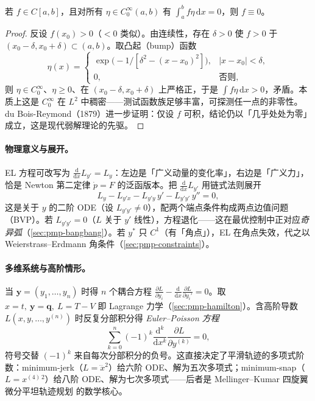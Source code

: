 \begin{lemma}\label{lem:pmp-dubois}
若 $f\in C[a,b]$，且对所有 $\eta\in C_0^\infty(a,b)$ 有 $\int_a^b f\eta\,\mathrm dx=0$，则 $f\equiv 0$。
\end{lemma}

\begin{proof}
反设 $f(x_0)>0$（$<0$ 类似）。由连续性，存在 $\delta>0$ 使 $f>0$ 于 $(x_0-\delta,x_0+\delta)\subset(a,b)$。取凸起（bump）函数
\begin{equation}
  \eta(x)=\begin{cases}\exp\!\big(-1/[\delta^2-(x-x_0)^2]\big),&|x-x_0|<\delta,\\[2pt]0,&\text{否则,}\end{cases}
  \label{eq:pmp-bump}
\end{equation}
则 $\eta\in C_0^\infty$、$\eta\ge 0$、在 $(x_0-\delta,x_0+\delta)$ 上严格正，于是 $\int f\eta\,\mathrm dx>0$，矛盾。本质上这是 $C_0^\infty$ 在 $L^2$ 中稠密——测试函数族足够丰富，可探测任一点的非零性。du Bois-Reymond（1879）进一步证明：仅设 $f$ 可积，结论仍以「几乎处处为零」成立，这是现代弱解理论的先驱。
\end{proof}

\paragraph{物理意义与展开。}
EL 方程可改写为 $\tfrac{\mathrm d}{\mathrm dx}L_{y'}=L_y$：左边是「广义动量的变化率」，右边是「广义力」，恰是 Newton 第二定律 $\dot p=F$ 的泛函版本。把 $\tfrac{\mathrm d}{\mathrm dx}L_{y'}$ 用链式法则展开
\begin{equation}
  L_y-L_{y'x}-L_{y'y}\,y'-L_{y'y'}\,y''=0,
  \label{eq:pmp-el-expanded}
\end{equation}
这是关于 $y$ 的二阶 ODE（设 $L_{y'y'}\ne 0$），配两个端点条件构成两点边值问题（BVP）。若 $L_{y'y'}=0$（$L$ 关于 $y'$ 线性），方程退化——这在最优控制中正对应\emph{奇异弧}（\cref{sec:pmp-bangbang}）。若 $y^\ast$ 只 $C^1$（有「角点」），EL 在角点失效，代之以 Weierstrass--Erdmann 角条件（\cref{sec:pmp-constraints}）。

\paragraph{多维系统与高阶情形。}
当 $\mathbf y=(y_1,\dots,y_n)$ 时得 $n$ 个耦合方程 $\tfrac{\partial L}{\partial y_i}-\tfrac{\mathrm d}{\mathrm dx}\tfrac{\partial L}{\partial y_i'}=0$。取 $x=t,\ \mathbf y=\mathbf q,\ L=T-V$ 即 Lagrange 力学（\cref{sec:pmp-hamilton}）。含高阶导数 $L(x,y,\dots,y^{(n)})$ 时反复分部积分得 \emph{Euler--Poisson 方程}
\begin{equation}
  \sum_{k=0}^{n}(-1)^k\frac{\mathrm d^k}{\mathrm dx^k}\frac{\partial L}{\partial y^{(k)}}=0,
  \label{eq:pmp-euler-poisson}
\end{equation}
符号交替 $(-1)^k$ 来自每次分部积分的负号。这直接决定了平滑轨迹的多项式阶数：minimum-jerk（$L=\dddot x^2$）给六阶 ODE、解为五次多项式；minimum-snap（$L=x^{(4)\,2}$）给八阶 ODE、解为七次多项式——后者是 Mellinger--Kumar 四旋翼微分平坦轨迹规划\cite{mellinger2011minimum} 的数学核心。

